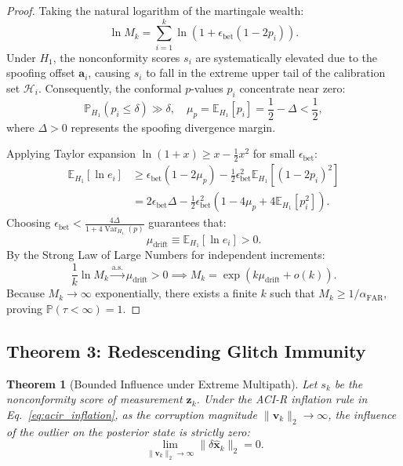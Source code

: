 \documentclass[journal,twocolumn]{IEEEtran}
\newtheorem{theorem}{Theorem}
\newcommand{\E}{\mathbb{E}}
\newcommand{\Prob}{\mathbb{P}}
\begin{document}
\begin{proof}
Taking the natural logarithm of the martingale wealth:
\begin{equation}
    \ln M_k = \sum_{i=1}^k \ln \left( 1 + \epsilon_{\text{bet}} (1 - 2 p_i) \right).
\end{equation}
Under $H_1$, the nonconformity scores $s_i$ are systematically elevated due to the spoofing offset $\mathbf{a}_i$, causing $s_i$ to fall in the extreme upper tail of the calibration set $\mathcal{H}_i$. Consequently, the conformal $p$-values $p_i$ concentrate near zero:
\begin{equation}
    \Prob_{H_1}(p_i \le \delta) \gg \delta, \quad \mu_p = \E_{H_1}[p_i] = \frac{1}{2} - \Delta < \frac{1}{2},
\end{equation}
where $\Delta > 0$ represents the spoofing divergence margin.

Applying Taylor expansion $\ln(1 + x) \ge x - \frac{1}{2} x^2$ for small $\epsilon_{\text{bet}}$:
\begin{align}
    \E_{H_1}[\ln e_i] &\ge \epsilon_{\text{bet}} (1 - 2 \mu_p) - \frac{1}{2} \epsilon_{\text{bet}}^2 \E_{H_1}[(1 - 2 p_i)^2] \nonumber \\
    &= 2 \epsilon_{\text{bet}} \Delta - \frac{1}{2} \epsilon_{\text{bet}}^2 \left( 1 - 4 \mu_p + 4 \E_{H_1}[p_i^2] \right).
\end{align}
Choosing $\epsilon_{\text{bet}} < \frac{4 \Delta}{1 + 4 \operatorname{Var}_{H_1}(p)}$ guarantees that:
\begin{equation}
    \mu_{\text{drift}} \equiv \E_{H_1}[\ln e_i] > 0.
\end{equation}
By the Strong Law of Large Numbers for independent increments:
\begin{equation}
    \frac{1}{k} \ln M_k \xrightarrow{\text{a.s.}} \mu_{\text{drift}} > 0 \implies M_k = \exp\left( k \mu_{\text{drift}} + o(k) \right).
\end{equation}
Because $M_k \to \infty$ exponentially, there exists a finite $k$ such that $M_k \ge 1 / \alpha_{\mathrm{FAR}}$, proving $\Prob(\tau < \infty) = 1$.
\end{proof}

\subsection{Theorem 3: Redescending Glitch Immunity}
\begin{theorem}[Bounded Influence under Extreme Multipath]
Let $s_k$ be the nonconformity score of measurement $\mathbf{z}_k$. Under the ACI-R inflation rule in Eq.~\eqref{eq:acir_inflation}, as the corruption magnitude $\|\mathbf{v}_k\|_2 \to \infty$, the influence of the outlier on the posterior state is strictly zero:
\begin{equation}
    \lim_{\|\mathbf{v}_k\|_2 \to \infty} \|\delta \hat{\mathbf{x}}_k\|_2 = 0.
\end{equation}
\label{thm:glitch_immunity}
\end{theorem}
\end{document}
